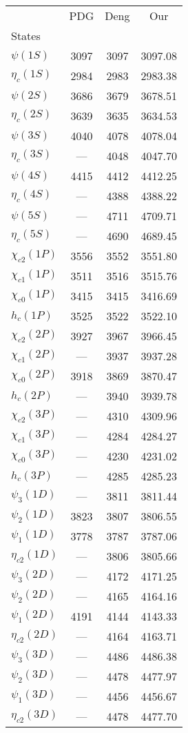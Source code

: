 \begin{tabular}{lccc}
\toprule
{} &   PDG &  Deng &      Our \\
States          &       &       &          \\
\midrule
$\psi(1S)$      &  3097 &  3097 &  3097.08 \\
$\eta_{c}(1S)$  &  2984 &  2983 &  2983.38 \\
$\psi(2S)$      &  3686 &  3679 &  3678.51 \\
$\eta_{c}(2S)$  &  3639 &  3635 &  3634.53 \\
$\psi(3S)$      &  4040 &  4078 &  4078.04 \\
$\eta_{c}(3S)$  &     — &  4048 &  4047.70 \\
$\psi(4S)$      &  4415 &  4412 &  4412.25 \\
$\eta_{c}(4S)$  &     — &  4388 &  4388.22 \\
$\psi(5S)$      &     — &  4711 &  4709.71 \\
$\eta_{c}(5S)$  &     — &  4690 &  4689.45 \\
$\chi_{c2}(1P)$ &  3556 &  3552 &  3551.80 \\
$\chi_{c1}(1P)$ &  3511 &  3516 &  3515.76 \\
$\chi_{c0}(1P)$ &  3415 &  3415 &  3416.69 \\
$h_{c}(1P)$     &  3525 &  3522 &  3522.10 \\
$\chi_{c2}(2P)$ &  3927 &  3967 &  3966.45 \\
$\chi_{c1}(2P)$ &     — &  3937 &  3937.28 \\
$\chi_{c0}(2P)$ &  3918 &  3869 &  3870.47 \\
$h_{c}(2P)$     &     — &  3940 &  3939.78 \\
$\chi_{c2}(3P)$ &     — &  4310 &  4309.96 \\
$\chi_{c1}(3P)$ &     — &  4284 &  4284.27 \\
$\chi_{c0}(3P)$ &     — &  4230 &  4231.02 \\
$h_{c}(3P)$     &     — &  4285 &  4285.23 \\
$\psi_{3}(1D)$  &     — &  3811 &  3811.44 \\
$\psi_{2}(1D)$  &  3823 &  3807 &  3806.55 \\
$\psi_{1}(1D)$  &  3778 &  3787 &  3787.06 \\
$\eta_{c2}(1D)$ &     — &  3806 &  3805.66 \\
$\psi_{3}(2D)$  &     — &  4172 &  4171.25 \\
$\psi_{2}(2D)$  &     — &  4165 &  4164.16 \\
$\psi_{1}(2D)$  &  4191 &  4144 &  4143.33 \\
$\eta_{c2}(2D)$ &     — &  4164 &  4163.71 \\
$\psi_{3}(3D)$  &     — &  4486 &  4486.38 \\
$\psi_{2}(3D)$  &     — &  4478 &  4477.97 \\
$\psi_{1}(3D)$  &     — &  4456 &  4456.67 \\
$\eta_{c2}(3D)$ &     — &  4478 &  4477.70 \\
\bottomrule
\end{tabular}
